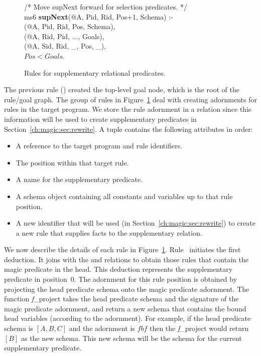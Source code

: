 \begin{figure}[!t]
\begin{boxedminipage}{\linewidth}
/* Move supNext forward for selection predicates. */ \\
ms6 {\bf supNext}(@A, Pid, Rid, Pos+1, Schema) :- \\
(@A, Pid, Rid, Pos, Schema), \\
(@A, Rid, Pid, ..., Goals), \\
(@A, Sid, Rid, \_, Pos, \_), \\
\datalogspace $Pos < Goals$. 
\end{boxedminipage}
\caption{\label{ch:magic:fig:magic2}Rules for supplementary relational predicates.}
\end{figure}

The previous rule () created the top-level goal node, which is the root
of the rule/goal graph.  The group of rules in Figure~\ref{ch:magic:fig:magic2}
deal with creating adornments for rules in the target program.  We store the
rule adornment in a  relation since this information will be used to
create supplementary predicates in Section~\ref{ch:magic:sec:rewrite}.  A
 tuple contains the following attributes in order:
\begin{itemize}
   \ssp
  \item A reference to the target program and rule identifiers. 
  \item The position within that target rule.
  \item A name for the supplementary predicate.
  \item A schema object containing all constants and variables up to that rule position.
  \item A new identifier that will be used (in Section~\ref{ch:magic:sec:rewrite}) to create 
    a new rule that supplies facts to the supplementary relation.
\end{itemize}

We now describe the details of each rule in Figure~\ref{ch:magic:fig:magic2}.
Rule~ initiates the first  deduction.  It joins 
with the  and  relations to obtain those rules that
contain the magic predicate in the head.  This deduction represents the
supplementary predicate in position~$0$.  The adornment for this rule position
is obtained by projecting the head predicate schema onto the magic predicate
adornment.  The function {\emph f\_project} takes the head predicate schema and
the signature of the magic predicate adornment, and return a new schema that
contains the bound head variables (according to the adornment). For example,
if the head predicate schema is $[A, B, C]$ and the adornment is $fbf$ then
the {\emph f\_project} would return $[B]$ as the new schema. This new schema
will be the schema for the current supplementary predicate.


